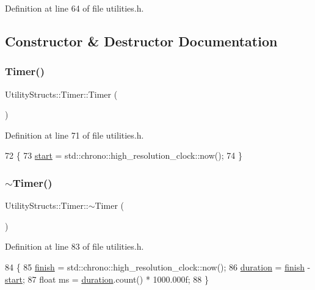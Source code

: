 Definition at line 64 of file utilities.\+h.



\subsection{Constructor \& Destructor Documentation}
\mbox{\label{class_utility_structs_1_1_timer_a8513b72cae3808920cc5f76c28b34d63}} 
\subsubsection{\texorpdfstring{Timer()}{Timer()}}
{\footnotesize\ttfamily Utility\+Structs\+::\+Timer\+::\+Timer (\begin{DoxyParamCaption}{ }\end{DoxyParamCaption})\hspace{0.3cm}{\ttfamily [inline]}}



Definition at line 71 of file utilities.\+h.


\begin{DoxyCode}
72     \{
73         \hyperlink{class_utility_structs_1_1_timer_a60bc754cb86990dad0003e8d49048c07}{start} = std::chrono::high\_resolution\_clock::now();
74     \}
\end{DoxyCode}
\mbox{\label{class_utility_structs_1_1_timer_a377c1febadb76e78d9a36bd81b3ab676}} 
\subsubsection{\texorpdfstring{$\sim$\+Timer()}{~Timer()}}
{\footnotesize\ttfamily Utility\+Structs\+::\+Timer\+::$\sim$\+Timer (\begin{DoxyParamCaption}{ }\end{DoxyParamCaption})\hspace{0.3cm}{\ttfamily [inline]}}



Definition at line 83 of file utilities.\+h.


\begin{DoxyCode}
84     \{
85         \hyperlink{class_utility_structs_1_1_timer_a9b87226726489b3885d6faf4373c34b5}{finish} = std::chrono::high\_resolution\_clock::now();
86         \hyperlink{class_utility_structs_1_1_timer_aa78ff6477de7008371025bd459a262e4}{duration} = \hyperlink{class_utility_structs_1_1_timer_a9b87226726489b3885d6faf4373c34b5}{finish} - \hyperlink{class_utility_structs_1_1_timer_a60bc754cb86990dad0003e8d49048c07}{start};
87         \textcolor{keywordtype}{float} ms = \hyperlink{class_utility_structs_1_1_timer_aa78ff6477de7008371025bd459a262e4}{duration}.count() * 1000.000f;
88     \}
\end{DoxyCode}


